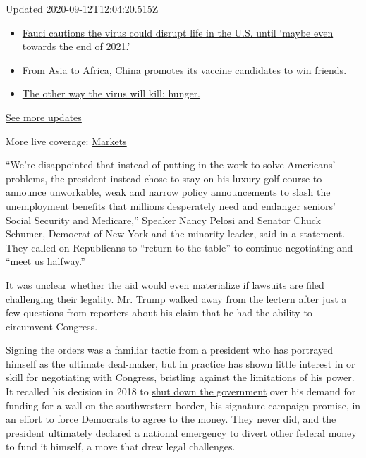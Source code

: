 Updated 2020-09-12T12:04:20.515Z

\begin{itemize}
\tightlist
\item
  \href{https://www.nytimes3xbfgragh.onion/2020/09/11/world/covid-19-coronavirus.html?action=click\&pgtype=Article\&state=default\&region=MAIN_CONTENT_1\&context=storylines_live_updates\#link-dfb8a16}{Fauci
  cautions the virus could disrupt life in the U.S. until `maybe even
  towards the end of 2021.'}
\item
  \href{https://www.nytimes3xbfgragh.onion/2020/09/11/world/covid-19-coronavirus.html?action=click\&pgtype=Article\&state=default\&region=MAIN_CONTENT_1\&context=storylines_live_updates\#link-7104d154}{From
  Asia to Africa, China promotes its vaccine candidates to win friends.}
\item
  \href{https://www.nytimes3xbfgragh.onion/2020/09/11/world/covid-19-coronavirus.html?action=click\&pgtype=Article\&state=default\&region=MAIN_CONTENT_1\&context=storylines_live_updates\#link-393ad215}{The
  other way the virus will kill: hunger.}
\end{itemize}

\href{https://www.nytimes3xbfgragh.onion/2020/09/11/world/covid-19-coronavirus.html?action=click\&pgtype=Article\&state=default\&region=MAIN_CONTENT_1\&context=storylines_live_updates}{See
more updates}

More live coverage:
\href{https://www.nytimes3xbfgragh.onion/live/2020/09/11/business/stock-market-today-coronavirus?action=click\&pgtype=Article\&state=default\&region=MAIN_CONTENT_1\&context=storylines_live_updates}{Markets}

``We're disappointed that instead of putting in the work to solve
Americans' problems, the president instead chose to stay on his luxury
golf course to announce unworkable, weak and narrow policy announcements
to slash the unemployment benefits that millions desperately need and
endanger seniors' Social Security and Medicare,'' Speaker Nancy Pelosi
and Senator Chuck Schumer, Democrat of New York and the minority leader,
said in a statement. They called on Republicans to ``return to the
table'' to continue negotiating and ``meet us halfway.''

It was unclear whether the aid would even materialize if lawsuits are
filed challenging their legality. Mr. Trump walked away from the lectern
after just a few questions from reporters about his claim that he had
the ability to circumvent Congress.

Signing the orders was a familiar tactic from a president who has
portrayed himself as the ultimate deal-maker, but in practice has shown
little interest in or skill for negotiating with Congress, bristling
against the limitations of his power. It recalled his decision in 2018
to
\href{https://www.nytimes3xbfgragh.onion/2018/12/21/us/politics/trump-shutdown-border-wall.html}{shut
down the government} over his demand for funding for a wall on the
southwestern border, his signature campaign promise, in an effort to
force Democrats to agree to the money. They never did, and the president
ultimately declared a national emergency to divert other federal money
to fund it himself, a move that drew legal challenges.

